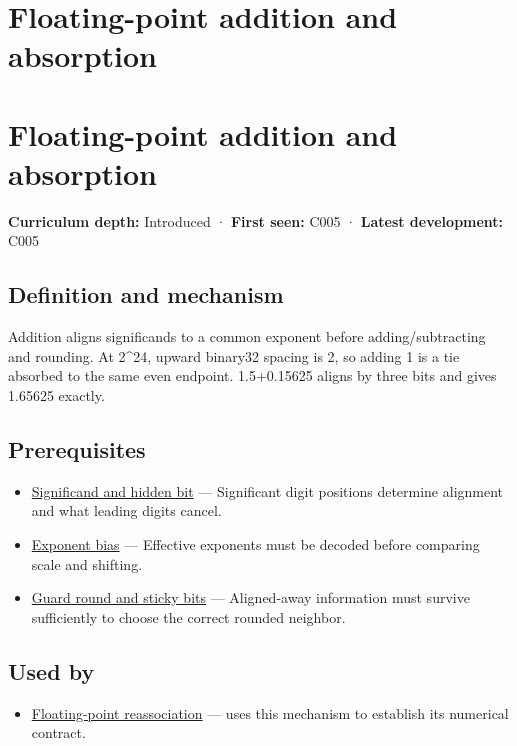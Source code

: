 \hypertarget{appendix-a1b1b4580dfd}{}
\section*{Floating-point addition and absorption}
\section{Floating-point addition and absorption}\label{appendix-a1b1b4580dfd-floating-point-addition-and-absorption}

\textbf{Curriculum depth:} Introduced · \textbf{First seen:} C005 · \textbf{Latest development:} C005

\subsection{Definition and mechanism}\label{appendix-a1b1b4580dfd-definition-and-mechanism}

Addition aligns significands to a common exponent before adding/subtracting and rounding. At 2\^{}24, upward binary32 spacing is 2, so adding 1 is a tie absorbed to the same even endpoint. 1.5+0.15625 aligns by three bits and gives 1.65625 exactly.

\subsection{Prerequisites}\label{appendix-a1b1b4580dfd-prerequisites}

\begin{itemize}
\tightlist
\item
  \hyperref[appendix-a24fd710cf67]{Significand and hidden bit} --- Significant digit positions determine alignment and what leading digits cancel.
\item
  \hyperref[appendix-2fae058c82e1]{Exponent bias} --- Effective exponents must be decoded before comparing scale and shifting.
\item
  \hyperref[appendix-b572b631069b]{Guard round and sticky bits} --- Aligned-away information must survive sufficiently to choose the correct rounded neighbor.
\end{itemize}

\subsection{Used by}\label{appendix-a1b1b4580dfd-used-by}

\begin{itemize}
\tightlist
\item
  \hyperref[appendix-c2ac4a84c283]{Floating-point reassociation} --- uses this mechanism to establish its numerical contract.
\end{itemize}

